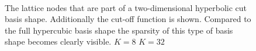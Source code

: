 \begin{figure}
  \centering
   \\
  \caption[Hyperbolic cut basis shape in two dimensions]{
    The lattice nodes that are part of a two-dimensional hyperbolic cut basis
    shape. Additionally the cut-off function is shown. Compared to the full
    hypercubic basis shape the sparsity of this type of basis shape becomes
    clearly visible.
     $K = 8$
     $K = 32$
    \label{fig:hyperbolic_cut_2D}
  }
\end{figure}

